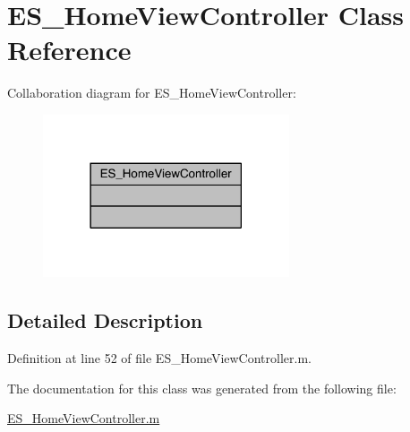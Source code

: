 \hypertarget{class_e_s___home_view_controller}{\section{E\+S\+\_\+\+Home\+View\+Controller Class Reference}
\label{class_e_s___home_view_controller}
}


Collaboration diagram for E\+S\+\_\+\+Home\+View\+Controller\+:\nopagebreak
\begin{figure}[H]
\begin{center}
\leavevmode
\includegraphics[width=206pt]{d8/df9/class_e_s___home_view_controller__coll__graph}
\end{center}
\end{figure}


\subsection{Detailed Description}


Definition at line 52 of file E\+S\+\_\+\+Home\+View\+Controller.\+m.



The documentation for this class was generated from the following file\+:\begin{DoxyCompactItemize}
\item 
\hyperlink{_e_s___home_view_controller_8m}{E\+S\+\_\+\+Home\+View\+Controller.\+m}\end{DoxyCompactItemize}
